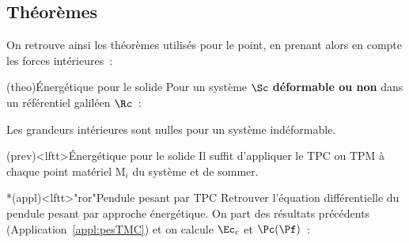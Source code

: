 \documentclass[../../main/main.tex]{subfiles}
\begin{document}
\subsection{Théorèmes}
On retrouve ainsi les théorèmes utilisés pour le point, en prenant alors en
compte les forces intérieures~:
\begin{tcb*}(theo){Énergétique pour le solide}
	Pour un système $\Sc$ \textbf{déformable ou non} dans un référentiel galiléen
	$\Rc$~:
	\smallbreak
	\begin{isd}
		\begin{center}
		\end{center}
		\vspace{-15pt}
		\tcblower
		\begin{center}
		\end{center}
		\vspace{-15pt}
	\end{isd}
	Les grandeurs intérieures sont nulles pour un système indéformable.
\end{tcb*}

\begin{tcb*}(prev)<lftt>{Énergétique pour le solide}
	Il suffit d'appliquer le TPC ou TPM à chaque point matériel M$_i$ du
	système et de sommer.
\end{tcb*}

\begin{tcb*}*(appl)<lftt>"ror"{Pendule pesant par TPC}
	Retrouver l'équation différentielle du pendule pesant par approche
	énergétique.
	\tcblower
	On part des résultats précédents (Application~\ref{appl:pesTMC}) et on calcule
	$\Ec_c$ et $\Pc(\Pf)$~:
	\vspace{-15pt}
\end{tcb*}
\end{document}
